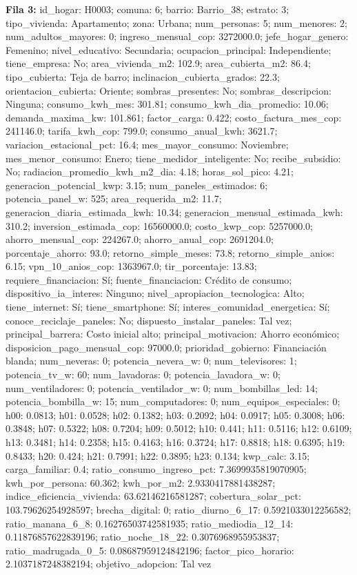 {\footnotesize\textbf{Fila 3:} id\_hogar: H0003; comuna: 6; barrio: Barrio\_38; estrato: 3; tipo\_vivienda: Apartamento; zona: Urbana; num\_personas: 5; num\_menores: 2; num\_adultos\_mayores: 0; ingreso\_mensual\_cop: 3272000.0; jefe\_hogar\_genero: Femenino; nivel\_educativo: Secundaria; ocupacion\_principal: Independiente; tiene\_empresa: No; area\_vivienda\_m2: 102.9; area\_cubierta\_m2: 86.4; tipo\_cubierta: Teja de barro; inclinacion\_cubierta\_grados: 22.3; orientacion\_cubierta: Oriente; sombras\_presentes: No; sombras\_descripcion: Ninguna; consumo\_kwh\_mes: 301.81; consumo\_kwh\_dia\_promedio: 10.06; demanda\_maxima\_kw: 101.861; factor\_carga: 0.422; costo\_factura\_mes\_cop: 241146.0; tarifa\_kwh\_cop: 799.0; consumo\_anual\_kwh: 3621.7; variacion\_estacional\_pct: 16.4; mes\_mayor\_consumo: Noviembre; mes\_menor\_consumo: Enero; tiene\_medidor\_inteligente: No; recibe\_subsidio: No; radiacion\_promedio\_kwh\_m2\_dia: 4.18; horas\_sol\_pico: 4.21; generacion\_potencial\_kwp: 3.15; num\_paneles\_estimados: 6; potencia\_panel\_w: 525; area\_requerida\_m2: 11.7; generacion\_diaria\_estimada\_kwh: 10.34; generacion\_mensual\_estimada\_kwh: 310.2; inversion\_estimada\_cop: 16560000.0; costo\_kwp\_cop: 5257000.0; ahorro\_mensual\_cop: 224267.0; ahorro\_anual\_cop: 2691204.0; porcentaje\_ahorro: 93.0; retorno\_simple\_meses: 73.8; retorno\_simple\_anios: 6.15; vpn\_10\_anios\_cop: 1363967.0; tir\_porcentaje: 13.83; requiere\_financiacion: Sí; fuente\_financiacion: Crédito de consumo; dispositivo\_ia\_interes: Ninguno; nivel\_apropiacion\_tecnologica: Alto; tiene\_internet: Sí; tiene\_smartphone: Sí; interes\_comunidad\_energetica: Sí; conoce\_reciclaje\_paneles: No; dispuesto\_instalar\_paneles: Tal vez; principal\_barrera: Costo inicial alto; principal\_motivacion: Ahorro económico; disposicion\_pago\_mensual\_cop: 97000.0; prioridad\_gobierno: Financiación blanda; num\_neveras: 0; potencia\_nevera\_w: 0; num\_televisores: 1; potencia\_tv\_w: 60; num\_lavadoras: 0; potencia\_lavadora\_w: 0; num\_ventiladores: 0; potencia\_ventilador\_w: 0; num\_bombillas\_led: 14; potencia\_bombilla\_w: 15; num\_computadores: 0; num\_equipos\_especiales: 0; h00: 0.0813; h01: 0.0528; h02: 0.1382; h03: 0.2092; h04: 0.0917; h05: 0.3008; h06: 0.3848; h07: 0.5322; h08: 0.7204; h09: 0.5012; h10: 0.441; h11: 0.5116; h12: 0.6109; h13: 0.3481; h14: 0.2358; h15: 0.4163; h16: 0.3724; h17: 0.8818; h18: 0.6395; h19: 0.8433; h20: 0.424; h21: 0.7991; h22: 0.3895; h23: 0.134; kwp\_calc: 3.15; carga\_familiar: 0.4; ratio\_consumo\_ingreso\_pct: 7.3699935819070905; kwh\_por\_persona: 60.362; kwh\_por\_m2: 2.9330417881438287; indice\_eficiencia\_vivienda: 63.62146216581287; cobertura\_solar\_pct: 103.79626254928597; brecha\_digital: 0; ratio\_diurno\_6\_17: 0.5921033012256582; ratio\_manana\_6\_8: 0.16276503742581935; ratio\_mediodia\_12\_14: 0.11876857622839196; ratio\_noche\_18\_22: 0.3076968955953837; ratio\_madrugada\_0\_5: 0.08687959124842196; factor\_pico\_horario: 2.1037187248382194; objetivo\_adopcion: Tal vez\par}
